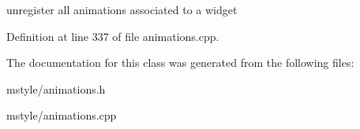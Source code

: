 unregister all animations associated to a widget 

Definition at line 337 of file animations.\+cpp.



The documentation for this class was generated from the following files\+:\begin{DoxyCompactItemize}
\item 
mstyle/animations.\+h\item 
mstyle/animations.\+cpp\end{DoxyCompactItemize}
